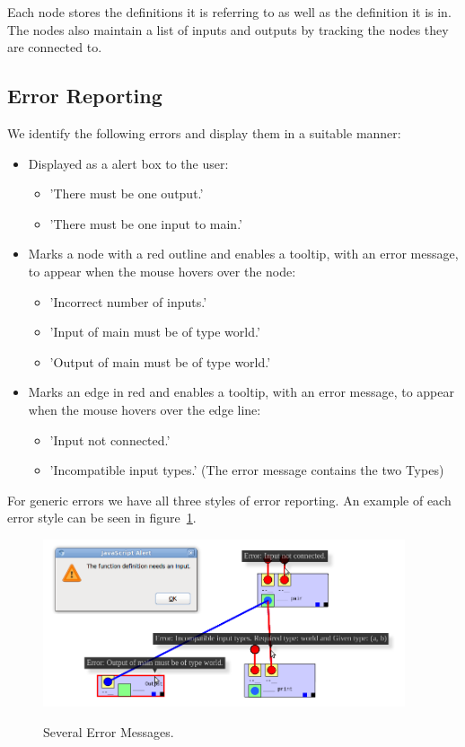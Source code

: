 \documentclass[12pt,UTF8,a4]{article}
\begin{document}
Each node stores the definitions it is referring to as well as the definition it is in. The nodes also maintain a list of inputs and outputs by tracking the nodes they are connected to.

\subsection{Error Reporting}

We identify the following errors and display them in a suitable manner:

\begin{itemize}
  \item Displayed as a alert box to the user:
  \begin{itemize}
    \item 'There must be one output.'
    \item 'There must be one input to main.'
  \end{itemize}
  \item Marks a node with a red outline and enables a tooltip, with an error message, to appear when the mouse hovers over the node:
  \begin{itemize}
    \item 'Incorrect number of inputs.'
    \item 'Input of main must be of type world.'
    \item 'Output of main must be of type world.'
  \end{itemize}
  \item Marks an edge in red and enables a tooltip, with an error message, to appear when the mouse hovers over the edge line:
  \begin{itemize}
    \item 'Input not connected.'
    \item 'Incompatible input types.' (The error message contains the two Types)
  \end{itemize}
\end{itemize}

For generic errors we have all three styles of error reporting. An example of each error style can be seen in figure~\ref{fig:errors}.

\begin{figure}[h!]
\center
\includegraphics[width=0.95\textwidth]{./images/error_displays_cropped.png} \\
\caption{Several Error Messages.}\label{fig:errors}
\end{figure}
\end{document}

